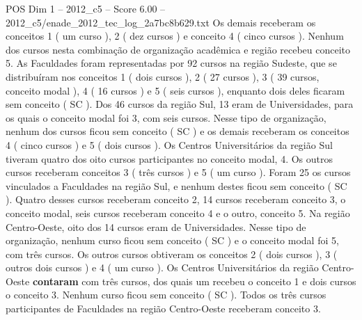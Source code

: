 \begin{textsample}{POS Dim 1 – 2012\_c5 – Score 6.00 – 2012\_c5/enade\_2012\_tec\_log\_2a7bc8b629.txt}
Os demais receberam os conceitos 1 ( um curso ), 2 ( dez cursos ) e conceito 4 ( cinco cursos ).
Nenhum dos cursos nesta combinação de organização acadêmica e região recebeu conceito 5.
As Faculdades foram representadas por 92 cursos na região Sudeste, que se distribuíram nos conceitos 1 ( dois cursos ), 2 ( 27 cursos ), 3 ( 39 cursos, conceito modal ), 4 ( 16 cursos ) e 5 ( seis cursos ), enquanto dois deles ficaram sem conceito ( SC ).
Dos 46 cursos da região Sul, 13 eram de Universidades, para os quais o conceito modal foi 3, com seis cursos.
Nesse tipo de organização, nenhum dos cursos ficou sem conceito ( SC ) e os demais receberam os conceitos 4 ( cinco cursos ) e 5 ( dois cursos ).
Os Centros Universitários da região Sul tiveram quatro dos oito cursos participantes no conceito modal, 4.
Os outros cursos receberam conceitos 3 ( três cursos ) e 5 ( um curso ).
Foram 25 os cursos vinculados a Faculdades na região Sul, e nenhum destes ficou sem conceito ( SC ).
Quatro desses cursos receberam conceito 2, 14 cursos receberam conceito 3, o conceito modal, seis cursos receberam conceito 4 e o outro, conceito 5.
Na região Centro-Oeste, oito dos 14 cursos eram de Universidades.
Nesse tipo de organização, nenhum curso ficou sem conceito ( SC ) e o conceito modal foi 5, com três cursos.
Os outros cursos obtiveram os conceitos 2 ( dois cursos ), 3 ( outros dois cursos ) e 4 ( um curso ).
Os Centros Universitários da região Centro-Oeste \textbf{contaram} com três cursos, dos quais um recebeu o conceito 1 e dois cursos o conceito 3.
Nenhum curso ficou sem conceito ( SC ).
Todos os três cursos participantes de Faculdades na região Centro-Oeste receberam conceito 3.

\end{textsample}
